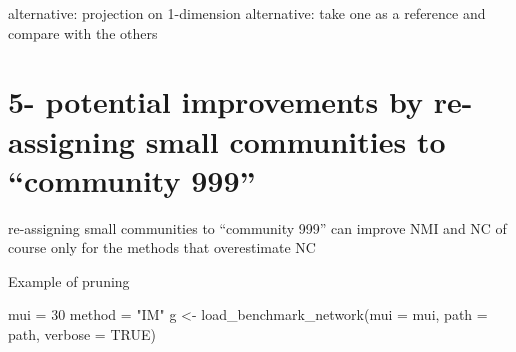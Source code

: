 \documentclass[
]{article}
\newenvironment{Shaded}{\begin{snugshade}}{\end{snugshade}}
\newcommand{\AttributeTok}[1]{\textcolor[rgb]{0.77,0.63,0.00}{#1}}
\newcommand{\ConstantTok}[1]{\textcolor[rgb]{0.00,0.00,0.00}{#1}}
\newcommand{\ControlFlowTok}[1]{\textcolor[rgb]{0.13,0.29,0.53}{\textbf{#1}}}
\newcommand{\DecValTok}[1]{\textcolor[rgb]{0.00,0.00,0.81}{#1}}
\newcommand{\FunctionTok}[1]{\textcolor[rgb]{0.00,0.00,0.00}{#1}}
\newcommand{\NormalTok}[1]{#1}
\newcommand{\OtherTok}[1]{\textcolor[rgb]{0.56,0.35,0.01}{#1}}
\newcommand{\SpecialCharTok}[1]{\textcolor[rgb]{0.00,0.00,0.00}{#1}}
\newcommand{\StringTok}[1]{\textcolor[rgb]{0.31,0.60,0.02}{#1}}
\begin{document}
alternative: projection on 1-dimension alternative: take one as a
reference and compare with the others

\newpage

\hypertarget{potential-improvements-by-re-assigning-small-communities-to-community-999}{%
\section{5- potential improvements by re-assigning small communities to
``community
999''}\label{potential-improvements-by-re-assigning-small-communities-to-community-999}}

re-assigning small communities to ``community 999'' can improve NMI and
NC of course only for the methods that overestimate NC

\begin{Shaded}
\end{Shaded}

Example of pruning

\begin{Shaded}
\begin{Highlighting}[]
\NormalTok{mui }\OtherTok{=} \DecValTok{30}
\NormalTok{method }\OtherTok{=} \StringTok{"IM"}
\NormalTok{g }\OtherTok{\textless{}{-}} \FunctionTok{load\_benchmark\_network}\NormalTok{(}\AttributeTok{mui =}\NormalTok{ mui, }\AttributeTok{path =}\NormalTok{ path, }\AttributeTok{verbose =} \ConstantTok{TRUE}\NormalTok{)}
\end{Highlighting}
\end{Shaded}
\end{document}
